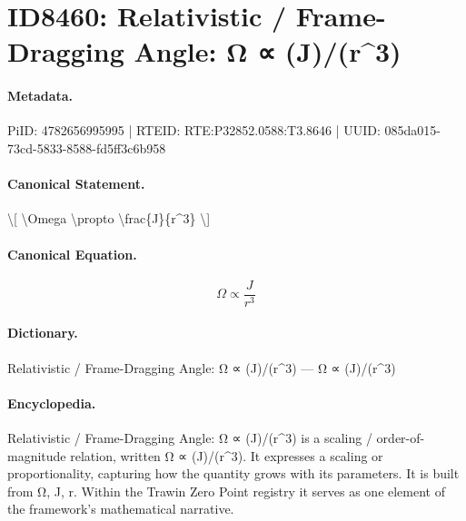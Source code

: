\section*{ID8460: Relativistic / Frame-Dragging Angle: Ω ∝ (J)/(r\textasciicircum{}3)}
\paragraph{Metadata.}
PiID: 4782656995995 | RTEID: RTE:P32852.0588:T3.8646 | UUID: 085da015-73cd-5833-8588-fd5ff3c6b958

\paragraph{Canonical Statement.}
\textbackslash{}[ \textbackslash{}Omega \textbackslash{}propto \textbackslash{}frac\{J\}\{r\textasciicircum{}3\} \textbackslash{}]

\paragraph{Canonical Equation.}
\[
\Omega \propto \frac{J}{r^3}
\]

\paragraph{Dictionary.}
Relativistic / Frame-Dragging Angle: Ω ∝ (J)/(r\textasciicircum{}3) — Ω ∝ (J)/(r\textasciicircum{}3)

\paragraph{Encyclopedia.}
Relativistic / Frame-Dragging Angle: Ω ∝ (J)/(r\textasciicircum{}3) is a scaling / order-of-magnitude relation, written Ω ∝ (J)/(r\textasciicircum{}3). It expresses a scaling or proportionality, capturing how the quantity grows with its parameters. It is built from Ω, J, r. Within the Trawin Zero Point registry it serves as one element of the framework's mathematical narrative.
